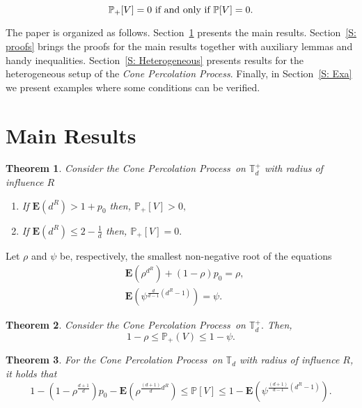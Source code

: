 \documentclass[12pt,reqno,oneside]{amsart}
\theoremstyle{plain}
\newtheorem{teo}{Theorem}[section]
\theoremstyle{definition}
\numberwithin{equation}{section}
\begin{document}
\begin{equation}
\label{E: Equal}
{{\mathbb P}}_+[V]=0 \hbox{ if and only if } {{\mathbb P}}[V]=0.
\end{equation}

The paper is organized as follows. Section~\ref{S: MR} presents the main results.
Section~\ref{S: proofs} brings the proofs for the main results together with
auxiliary lemmas and handy inequalities. Section~\ref{S: Heterogeneous} presents
results for the heterogeneous setup of the {\textit{Cone Percolation Process}}. Finally, in Section~\ref{S: Exa} 
we present examples where some conditions can be verified.

\section{Main Results}
\label{S: MR}

\begin{teo} 
\label{T:CSPAH}
Consider the {\textit{Cone Percolation Process}}\ on ${{\mathbb T}}_d^+$ with radius of influence $R$
\begin{enumerate}
\item[\textit{(I)}] If ${{\mathbf E}}(d^R) > 1 + p_0$ then, ${{\mathbb P}}_+[V] > 0,$
\item[\textit{(II)}] If ${{\mathbf E}}(d^R) \leq 2 - \frac{1}{d}$ then, ${{\mathbb P}}_+[V] = 0.$
\end{enumerate}
\end{teo}

Let $\rho$ and $\psi$ be, respectively, the smallest non-negative root of the equations
\begin{align}
& {{\mathbf E}}(\rho^{d^R}) + (1 - \rho)p_0 = \rho, \\
& {{\mathbf E}}(\psi^{\frac{d}{d-1}(d^{R}-1)}) = \psi.
\end{align}

\begin{teo} 
\label{T: SobrevivenciaTd+}
Consider the {\textit{Cone Percolation Process}}\ on ${{\mathbb T}}_d^+.$
Then,
\begin{displaymath}
1 - \rho \leq {{\mathbb P}}_+(V) \leq 1 - \psi.
\end{displaymath}
\end{teo}

\begin{teo} 
\label{T: ViveTd}
For the {\textit{Cone Percolation Process}}\ on ${{\mathbb T}}_d$ with radius of influence $R$, it holds that
\begin{equation}
\label{E: ViveTd}
1 - \displaystyle \left(1 -
\rho^{\frac{d+1}{d}}\right)p_0 -
{{\mathbf E}}\displaystyle \left(\rho^{\frac{(d+1)}{d}d^{R}}\right)
\leq {{\mathbb P}}[V] \leq 1 - {{\mathbf E}}\displaystyle
\left(\psi^{\frac{(d+1)}{d-1}(d^{R}-1)}\right).
\end{equation}
\end{teo}
\end{document}
